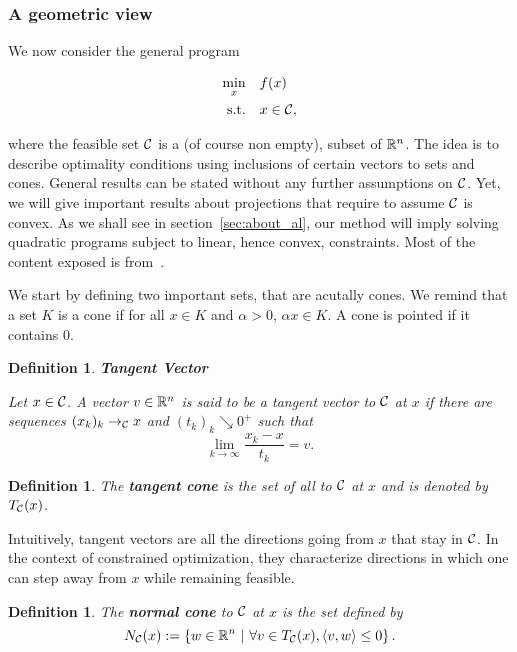 \documentclass[10pt]{article}
\newtheorem{definition}[theorem]{Definition}
\numberwithin{equation}{section}
\begin{document}
	\subsubsection{A geometric view}
	
	We now consider the general program
	
	\begin{equation}
		\label{eq:math_prog_geom}
		\begin{aligned}
			\min_x \quad & f(x) \\
			\text{s.t.} \quad & x \in {\mathcal{C}},
		\end{aligned}
	\end{equation}
	
	where the feasible set ${\mathcal{C}}$ is a (of course non empty), subset of ${\mathbb{R}}^n$. The idea is to describe optimality conditions using inclusions of certain vectors to sets and cones. General results can be stated without any further assumptions on ${\mathcal{C}}$. Yet, we will give important results about projections that require to assume ${\mathcal{C}}$ is convex. As we shall see in section~\ref{sec:about_al}, our method will imply solving quadratic programs subject to linear, hence convex, constraints. Most of the content exposed is from~\cite[][Chapter 12]{nocedalwright:2006}.
	
	We start by defining two important sets, that are acutally cones. We remind that a set $K$ is a cone if for all $x \in K$ and $\alpha >0 $, $\alpha x\in K $. A cone is pointed if it contains $0$.
	
	\begin{definition}\textbf{Tangent Vector}
		
		Let $x\in {\mathcal{C}}$. A vector $v\in {\mathbb{R}}^n$ is said to be a tangent vector to ${\mathcal{C}}$  at $x$ if there are sequences $(x_k)_k \to_{\mathcal{C}} x$ and $(t_k)_k \searrow 0^+$ such that 
		\[\lim\limits_{k\to \infty} \dfrac{x_k-x}{t_k}=v.\]
	\end{definition}
	
	\begin{definition}
		
	The \textbf{tangent cone} is the set of all to ${\mathcal{C}}$ at $x$ and is denoted by $T_{\mathcal{C}}(x)$.
	\end{definition}
	
	Intuitively, tangent vectors are all the directions going from $x$ that stay in ${\mathcal{C}}$. In the context of constrained optimization, they characterize directions in which one can step away from $x$ while remaining feasible. 
	
	\begin{definition}
		
		The \textbf{normal cone} to ${\mathcal{C}}$ at $x$ is the set defined by
		\[N_{\mathcal{C}} (x) := \left\{w \in {\mathbb{R}}^n\ | \ \forall v \in T_{\mathcal{C}}(x), \left\langle {v} , {w} \right\rangle \le 0\right\}.\]
	\end{definition}
	
\end{document}
